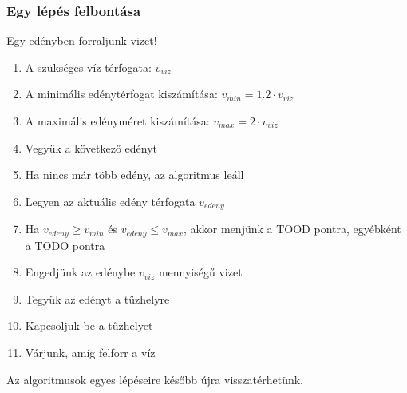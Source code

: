 \documentclass[
	11pt, %
]{beamer}
\begin{document}
\begin{frame}
  \frametitle{Egy lépés felbontása}

  Egy edényben forraljunk vizet!

  \begin{enumerate}
    \item{A szükséges víz térfogata: $v_{viz}$}
    \item{A minimális edénytérfogat kiszámítása: $v_{min} = 1.2 \cdot v_{viz}$}
    \item{A maximális edényméret kiszámítása: $v_{max} = 2 \cdot v_{viz}$}
    \item{Vegyük a következő edényt}
    \item{Ha nincs már több edény, az algoritmus leáll}
    \item{Legyen az aktuális edény térfogata $v_{edeny}$}
    \item{Ha $v_{edeny} \geq v_{min}$ és $v_{edeny} \leq v_{max}$, akkor menjünk a TOOD pontra, egyébként a TODO pontra}
    \item{Engedjünk az edénybe $v_{viz}$ mennyiségű vizet}
    \item{Tegyük az edényt a tűzhelyre}
    \item{Kapcsoljuk be a tűzhelyet}
    \item{Várjunk, amíg felforr a víz}
  \end{enumerate}

  Az algoritmusok egyes lépéseire később újra visszatérhetünk.
\end{frame}
\end{document}
